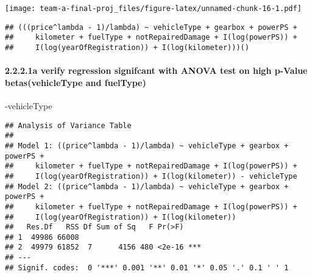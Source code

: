 \documentclass[]{article}
\newenvironment{Shaded}{\begin{snugshade}}{\end{snugshade}}
\newcommand{\DataTypeTok}[1]{\textcolor[rgb]{0.13,0.29,0.53}{#1}}
\newcommand{\DecValTok}[1]{\textcolor[rgb]{0.00,0.00,0.81}{#1}}
\newcommand{\KeywordTok}[1]{\textcolor[rgb]{0.13,0.29,0.53}{\textbf{#1}}}
\newcommand{\NormalTok}[1]{#1}
\newcommand{\OperatorTok}[1]{\textcolor[rgb]{0.81,0.36,0.00}{\textbf{#1}}}
\newcommand{\StringTok}[1]{\textcolor[rgb]{0.31,0.60,0.02}{#1}}
\let\oldparagraph\paragraph
\renewcommand{\paragraph}[1]{\oldparagraph{#1}\mbox{}}
\begin{document}
\texttt{[image: team-a-final-proj\_files/figure-latex/unnamed-chunk-16-1.pdf]}

\begin{Shaded}
\end{Shaded}

\begin{verbatim}
## (((price^lambda - 1)/lambda) ~ vehicleType + gearbox + powerPS + 
##     kilometer + fuelType + notRepairedDamage + I(log(powerPS)) + 
##     I(log(yearOfRegistration)) + I(log(kilometer)))()
\end{verbatim}

\hypertarget{a-verify-regression-signifcant-with-anova-test-on-high-p-value-betasvehicletype-and-fueltype}{%
\paragraph{2.2.2.1a verify regression signifcant with ANOVA test on high
p-Value betas(vehicleType and
fuelType)}\label{a-verify-regression-signifcant-with-anova-test-on-high-p-value-betasvehicletype-and-fueltype}}

-vehicleType

\begin{Shaded}
\end{Shaded}

\begin{verbatim}
## Analysis of Variance Table
## 
## Model 1: ((price^lambda - 1)/lambda) ~ vehicleType + gearbox + powerPS + 
##     kilometer + fuelType + notRepairedDamage + I(log(powerPS)) + 
##     I(log(yearOfRegistration)) + I(log(kilometer)) - vehicleType
## Model 2: ((price^lambda - 1)/lambda) ~ vehicleType + gearbox + powerPS + 
##     kilometer + fuelType + notRepairedDamage + I(log(powerPS)) + 
##     I(log(yearOfRegistration)) + I(log(kilometer))
##   Res.Df   RSS Df Sum of Sq   F Pr(>F)    
## 1  49986 66008                            
## 2  49979 61852  7      4156 480 <2e-16 ***
## ---
## Signif. codes:  0 '***' 0.001 '**' 0.01 '*' 0.05 '.' 0.1 ' ' 1
\end{verbatim}
\end{document}
